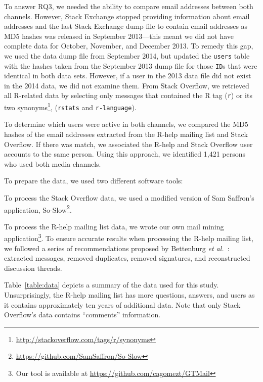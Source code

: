 \documentclass[smallextended]{svjour3}       %
\newcommand{\SO}{Stack Overflow\xspace}
\newcommand{\RH}{R-help\xspace}
\begin{document}
To answer RQ3, we needed the ability to compare email addresses between both channels. However, Stack Exchange stopped providing information about email addresses and the last Stack Exchange dump file to contain email addresses as MD5 hashes was released in September 2013---this meant we did not have complete data for October, November, and December 2013.  To remedy this gap, we used the data dump file from September 2014, but updated the \texttt{users} table with the hashes taken from the September 2013 dump file for those \texttt{ID}s that were identical in both data sets.  However, if a user in the 2013 data file did not exist in the 2014 data, we did not examine them.  From \SO, we retrieved all R-related data by selecting only messages that contained the R tag (\texttt{r}) or its two synonyms\footnote{\url{http://stackoverflow.com/tags/r/synonyms}},
(\texttt{rstats} and \texttt{r-language}).

To determine which users were active in both channels, we compared the MD5 hashes of the email addresses extracted from the \RH mailing list and \SO. If there was match, we associated the \RH and \SO user accounts to the same person. Using this approach, we identified 1,421 persons who used both media channels.

To prepare the data, we used two different software tools:
    \begin{enumerate*}[label=(\arabic*)]
    \item To process the \SO data, we used a modified version of Sam Saffron's application, So-Slow\footnote{\url{https://github.com/SamSaffron/So-Slow}}.
    \item To process the \RH mailing list data, we wrote our own mail mining application\footnote{Our tool is available at
            \url{https://github.com/cagomezt/GTMail}}. To ensure accurate results when processing the \RH mailing list, we followed a series of recommendations proposed by Bettenburg \textit{et al.}~\cite{Bettenburg2009}: extracted messages, removed duplicates, removed signatures, and reconstructed discussion threads.
    \end{enumerate*}
Table~\ref{table:data} depicts a summary of the data used for this study. Unsurprisingly, the \RH mailing list has more questions, answers, and users as it contains approximately ten years of additional data.
Note that only \SO's data contains ``comments'' information.
\end{document}
